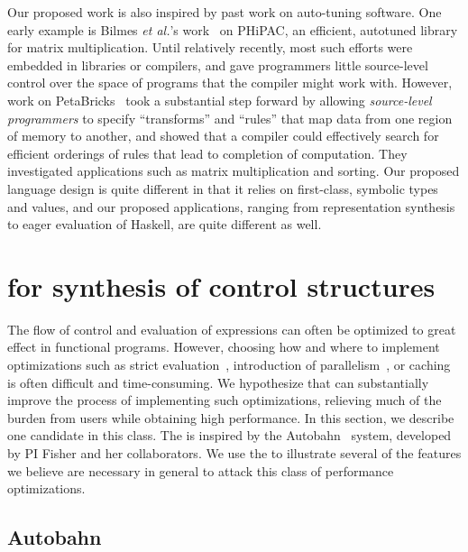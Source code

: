 Our proposed work is also inspired by past work on auto-tuning
software.  One early example is Bilmes \emph{et al.}'s 
work~\cite{Bilmes:autotune} on  PHiPAC, an efficient, autotuned library 
for matrix multiplication.  Until relatively recently, most such 
efforts were embedded
in libraries or compilers, and gave programmers little source-level
control over the space of programs that the compiler might work with.
However, work on PetaBricks~\cite{Ansel+:petabricks} took a substantial
step forward by allowing \emph{source-level programmers} to specify 
``transforms'' and ``rules'' that map data from one region of
memory to another, and showed that a compiler could effectively search
for efficient orderings of rules that lead to completion of computation.
They investigated applications such as matrix
multiplication and sorting.  Our proposed language design is quite
different in that it relies on first-class, symbolic types and values,
and our proposed applications, ranging from representation synthesis
to eager evaluation of Haskell, are quite different as well.


\section{\rasps for synthesis of control structures}

The flow of control and evaluation of expressions can often be
optimized to great effect in functional programs.  However, choosing
how and where to implement optimizations such as strict
evaluation~\cite{autobahn}, introduction of
parallelism~\cite{implicit-parallel}, or caching is often difficult
and time-consuming.  We hypothesize that \rasps can substantially
improve the process of implementing such optimizations, relieving much
of the burden from \rasp users while obtaining high performance.  In
this section, we describe one candidate \rasp in this class.
The \rasp is inspired by the
Autobahn~\cite{autobahn} system, developed by PI Fisher and her
collaborators.  We use the \rasp to illustrate several of the features
we believe are necessary in general to attack this class of performance
optimizations.

\subsection{Autobahn}

